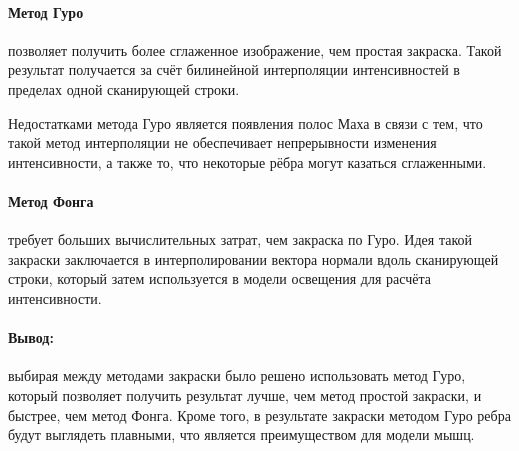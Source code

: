 \paragraph{Метод Гуро} позволяет получить более сглаженное изображение, чем простая закраска. Такой результат получается за счёт билинейной интерполяции интенсивностей в пределах одной сканирующей строки.
\par Недостатками метода Гуро является появления полос Маха в связи с тем, что такой метод интерполяции не обеспечивает непрерывности изменения интенсивности, а также то, что некоторые рёбра могут казаться сглаженными.

\paragraph{Метод Фонга} требует больших вычислительных затрат, чем закраска по Гуро. Идея такой закраски заключается в интерполировании вектора нормали вдоль сканирующей строки, который затем используется в модели освещения для расчёта интенсивности.

\paragraph{Вывод:} выбирая между методами закраски было решено использовать метод Гуро, который позволяет получить результат лучше, чем метод простой закраски, и быстрее, чем метод Фонга. Кроме того, в результате закраски методом Гуро ребра будут выглядеть плавными, что является преимуществом для модели мышц.

\label{sec:color}
